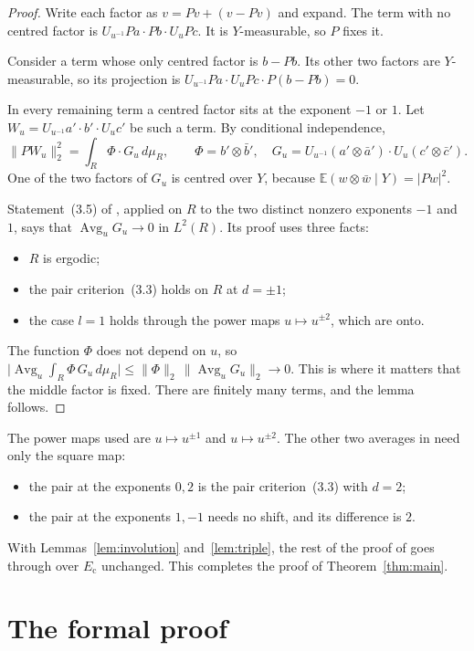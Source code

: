 \documentclass[11pt,a4paper]{amsart}
\theoremstyle{remark}
\newcommand{\Ec}{E_{\mathrm{c}}}
\begin{document}
\begin{proof}
Write each factor as $v=Pv+(v-Pv)$ and expand. The term with no centred factor is $U_{u^{-1}}Pa\cdot Pb\cdot U_uPc$.
It is $Y$-measurable, so $P$ fixes it.

Consider a term whose only centred factor is $b-Pb$. Its other two factors are $Y$-measurable, so its projection is
$U_{u^{-1}}Pa\cdot U_uPc\cdot P(b-Pb)=0$.

In every remaining term a centred factor sits at the exponent $-1$ or $1$. Let $W_u=U_{u^{-1}}a'\cdot b'\cdot U_uc'$
be such a term. By conditional independence,
\[
\|PW_u\|_2^2=\int_R\Phi\cdot G_u\,d\mu_R,\qquad \Phi=b'\otimes\bar b',\quad
G_u=U_{u^{-1}}(a'\otimes\bar a')\cdot U_u(c'\otimes\bar c').
\]
One of the two factors of $G_u$ is centred over $Y$, because $\mathbb{E}(w\otimes\bar w\mid Y)=|Pw|^2$.

Statement~(3.5) of \cite{OpenAI}, applied on $R$ to the two distinct nonzero exponents $-1$ and $1$, says that
$\operatorname{Avg}_uG_u\to0$ in $L^2(R)$. Its proof uses three facts:
\begin{itemize}
\item $R$ is ergodic;
\item the pair criterion~(3.3) holds on $R$ at $d=\pm1$;
\item the case $l=1$ holds through the power maps $u\mapsto u^{\pm2}$, which are onto.
\end{itemize}
The function $\Phi$ does not depend on $u$, so
$\bigl|\operatorname{Avg}_u\int_R\Phi\,G_u\,d\mu_R\bigr|\le\|\Phi\|_2\,\|\operatorname{Avg}_uG_u\|_2\to0$. This is
where it matters that the middle factor is fixed. There are finitely many terms, and the lemma follows.
\end{proof}

The power maps used are $u\mapsto u^{\pm1}$ and $u\mapsto u^{\pm2}$. The other two averages in
\cite[Lemma~3.3]{OpenAI} need only the square map:
\begin{itemize}
\item the pair at the exponents $0,2$ is the pair criterion~(3.3) with $d=2$;
\item the pair at the exponents $1,-1$ needs no shift, and its difference is $2$.
\end{itemize}
With Lemmas~\ref{lem:involution} and~\ref{lem:triple}, the rest of the proof of \cite[Prop.~4.2]{OpenAI} goes
through over $\Ec$ unchanged. This completes the proof of Theorem~\ref{thm:main}.

\section{The formal proof}\label{sec:lean}
\end{document}
